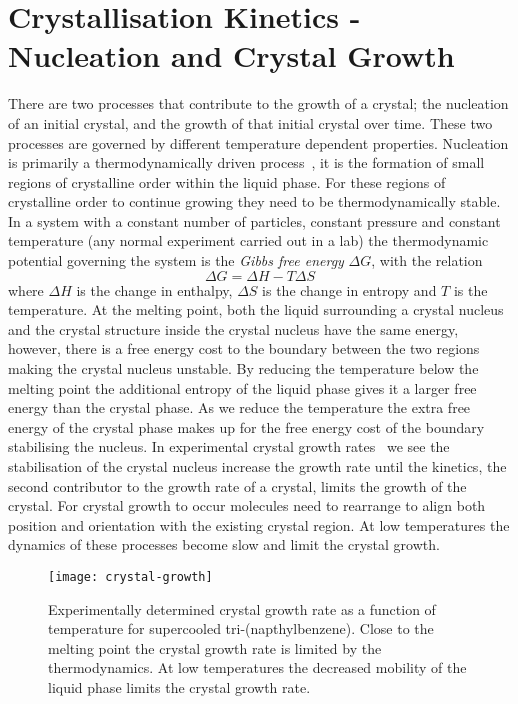 \section{Crystallisation Kinetics - Nucleation and Crystal Growth}

There are two processes that contribute to the growth of a crystal; the nucleation of an initial crystal, and the growth of that initial crystal over time. These two processes are governed by different temperature dependent properties. Nucleation is primarily a thermodynamically driven process~\cite{wu:04}, it is the formation of small regions of crystalline order within the liquid phase. For these regions of crystalline order to continue growing they need to be thermodynamically stable. In a system with a constant number of particles, constant pressure and constant temperature (any normal experiment carried out in a lab) the thermodynamic potential governing the system is the \emph{Gibbs free energy} $\Delta G$, with the relation 
\begin{equation}
\Delta G = \Delta H - T\Delta S
\end{equation}
where $\Delta H$ is the change in enthalpy, $\Delta S$ is the change in entropy and $T$ is the temperature. At the melting point, both the liquid surrounding a crystal nucleus and the crystal structure inside the crystal nucleus have the same energy, however, there is a free energy cost to the boundary between the two regions making the crystal nucleus unstable. By reducing the temperature below the melting point the additional entropy of the liquid phase gives it a larger free energy than the crystal phase. As we reduce the temperature the extra free energy of the crystal phase makes up for the free energy cost of the boundary stabilising the nucleus. In experimental crystal growth rates~ we see the stabilisation of the crystal nucleus increase the growth rate until the kinetics, the second contributor to the growth rate of a crystal, limits the growth of the crystal. For crystal growth to occur molecules need to rearrange to align both position and orientation with the existing crystal region. At low temperatures the dynamics of these processes become slow and limit the crystal growth.

\begin{figure}
    \centering
    \texttt{[image: crystal-growth]}
    \caption{Experimentally determined crystal growth rate as a function of temperature for supercooled tri-(napthylbenzene). Close to the melting point the crystal growth rate is limited by the thermodynamics. At low temperatures the decreased mobility of the liquid phase limits the crystal growth rate.}
    \label{fig:crys growth}
\end{figure}


